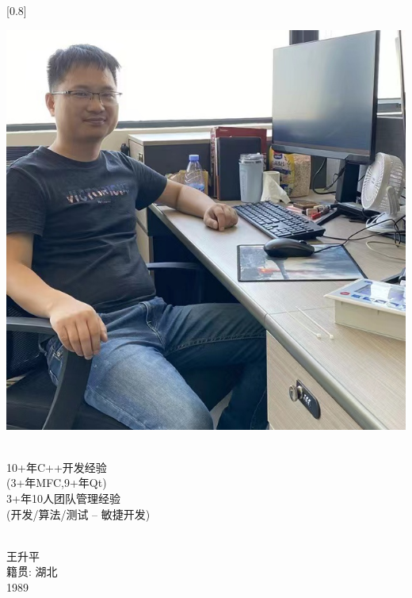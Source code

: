\documentclass[lighthipster]{simplehipstercv}
\begin{document}
	\setlength{\columnsep}{1.5cm}
	[0.8]
	\begin{paracol}{2}
		
		
		
		
		\footnotesize
		{\setasidefontcolour
			\flushright
			\begin{center}
				\includegraphics[width=\linewidth]{ShowMe.jpg}
			\end{center}
			\bigskip
			
			\\[0.5em]
			
			{
				\footnotesize
				10+年C++开发经验\\
				\tiny
				(3+年MFC,9+年Qt)\\
				\footnotesize
				3+年10人团队管理经验\\
				\tiny
				(开发/算法/测试 -- 敏捷开发)
			}
			\bigskip
			
			 \\[0.5em]
			王升平\\
			籍贯: 湖北\\ 
			1989
			
}
\end{paracol}
\end{document}
